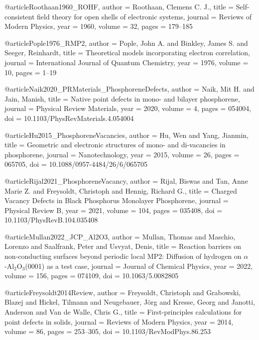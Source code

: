 @article{Roothaan1960_ROHF,
  author  = {Roothaan, Clemens C. J.},
  title   = {Self-consistent field theory for open shells of electronic systems},
  journal = {Reviews of Modern Physics},
  year    = {1960},
  volume  = {32},
  pages   = {179--185}
}

@article{Pople1976_RMP2,
  author  = {Pople, John A. and Binkley, James S. and Seeger, Reinhardt},
  title   = {Theoretical models incorporating electron correlation},
  journal = {International Journal of Quantum Chemistry},
  year    = {1976},
  volume  = {10},
  pages   = {1--19}
}


@article{Naik2020_PRMaterials_PhosphoreneDefects,
  author  = {Naik, Mit H. and Jain, Manish},
  title   = {Native point defects in mono- and bilayer phosphorene},
  journal = {Physical Review Materials},
  year    = {2020},
  volume  = {4},
  pages   = {054004},
  doi     = {10.1103/PhysRevMaterials.4.054004}
}

@article{Hu2015_PhosphoreneVacancies,
  author  = {Hu, Wen and Yang, Jianmin},
  title   = {Geometric and electronic structures of mono- and di-vacancies in phosphorene},
  journal = {Nanotechnology},
  year    = {2015},
  volume  = {26},
  pages   = {065705},
  doi     = {10.1088/0957-4484/26/6/065705}
}

@article{Rijal2021_PhosphoreneVacancy,
  author  = {Rijal, Biswas and Tan, Anne Marie Z. and Freysoldt, Christoph and Hennig, Richard G.},
  title   = {Charged Vacancy Defects in Black Phosphorus Monolayer Phosphorene},
  journal = {Physical Review B},
  year    = {2021},
  volume  = {104},
  pages   = {035408},
  doi     = {10.1103/PhysRevB.104.035408}
}


@article{Mullan2022_JCP_Al2O3,
  author  = {Mullan, Thomas and Maschio, Lorenzo and Saalfrank, Peter and Usvyat, Denis},
  title   = {Reaction barriers on non‑conducting surfaces beyond periodic local MP2: Diffusion of hydrogen on \(\alpha\)‑Al\(_2\)O\(_3\)(0001) as a test case},
  journal = {Journal of Chemical Physics},
  year    = {2022},
  volume  = {156},
  pages   = {074109},
  doi     = {10.1063/5.0082805}
}

@article{Freysoldt2014Review,
  author  = {Freysoldt, Christoph and Grabowski, Blazej and Hickel, Tilmann and
             Neugebauer, Jörg and Kresse, Georg and Janotti, Anderson and
             Van de Walle, Chris G.},
  title   = {First-principles calculations for point defects in solids},
  journal = {Reviews of Modern Physics},
  year    = {2014},
  volume  = {86},
  pages   = {253--305},
  doi     = {10.1103/RevModPhys.86.253}
}


